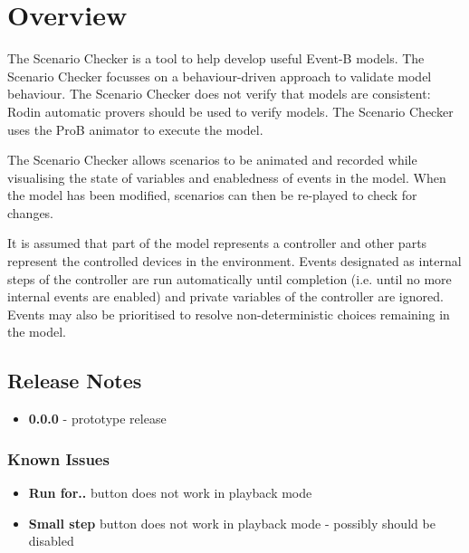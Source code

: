 \section{Overview}
\label{sec:overview}

The Scenario Checker is a tool to help develop useful Event-B models.
The Scenario Checker focusses on a behaviour-driven approach to validate model behaviour.
The Scenario Checker does not verify that models are consistent: Rodin automatic provers should be used to verify models.
The Scenario Checker uses the ProB animator to execute the model.

The Scenario Checker allows scenarios to be animated and recorded while visualising the state of variables and enabledness of events in the model.
When the model has been modified, scenarios can then be re-played to check for changes.

It is assumed that part of the model represents a controller and other parts represent the controlled devices in the environment.
Events designated as internal steps of the controller are run automatically until completion (i.e. until no more internal events are enabled) and private variables of the controller are ignored.
Events may also be prioritised to resolve non-deterministic choices remaining in the model.

\subsection{Release Notes}
\label{sec:release-notes}

\begin{itemize}
	\item \textbf{0.0.0} - prototype release
\end{itemize}

\subsubsection{Known Issues}
\label{sec:known-issues}

\begin{itemize}
	\item \textbf{Run for..} button does not work in playback mode
	\item \textbf{Small step} button does not work in playback mode - possibly should be disabled
\end{itemize}


